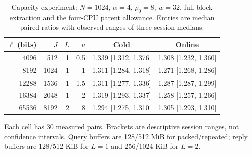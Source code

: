 \begin{table}[tbp]
\centering\small
\caption{Capacity experiment: $N=1024$, $\alpha=4$, $\rho_0=8$, $w=32$, full-block extraction and the four-CPU parent allowance. Entries are median paired ratios with observed ranges of three session medians.}
\label{tab:capacity}
\setlength{\tabcolsep}{4pt}
\begin{tabular}{@{}rrrrcc@{}}
\toprule
$\ell$ (bits) & $J$ & $L$ & $u$ & Cold & Online \\
\midrule
4096 & 512 & 1 & 0.5 & 1.339 [1.312, 1.376] & 1.308 [1.232, 1.360] \\
8192 & 1024 & 1 & 1 & 1.311 [1.284, 1.318] & 1.271 [1.268, 1.286] \\
12288 & 1536 & 1 & 1.5 & 1.311 [1.277, 1.336] & 1.287 [1.287, 1.299] \\
16384 & 2048 & 1 & 2 & 1.319 [1.293, 1.337] & 1.258 [1.257, 1.266] \\
65536 & 8192 & 2 & 8 & 1.294 [1.275, 1.310] & 1.305 [1.293, 1.310] \\
\bottomrule\end{tabular}
\par\smallskip\begin{minipage}{\linewidth}\footnotesize Each cell has 30 measured pairs. Brackets are descriptive session ranges, not confidence intervals. Query buffers are 128/512 MiB for packed/repeated; reply buffers are 128/512 KiB for $L=1$ and 256/1024 KiB for $L=2$.\end{minipage}
\end{table}
